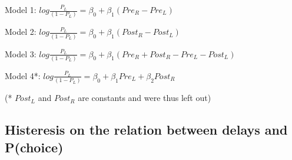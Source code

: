 \documentclass[11pt]{article}
\begin{document}
Model 1: \(log{\frac{P_L}{(1-P_L)}} = \beta_0 + \beta_1(Pre_R - Pre_L)\)

Model 2:
\(log{\frac{P_L}{(1-P_L)}} = \beta_0 + \beta_1(Post_R - Post_L)\)

Model 3:
\(log{\frac{P_L}{(1-P_L)}} = \beta_0 + \beta_1(Pre_R + Post_R - Pre_L - Post_L)\)

Model 4*:
\(log{\frac{P_L}{(1-P_L)}} = \beta_0 + \beta_1Pre_L + \beta_2Post_R\)

(* \(Post_L\) and \(Post_R\) are constants and were thus left out)

    \subsection{Histeresis on the relation between delays and
P(choice)}\label{histeresis-on-the-relation-between-delays-and-pchoice}
\end{document}
